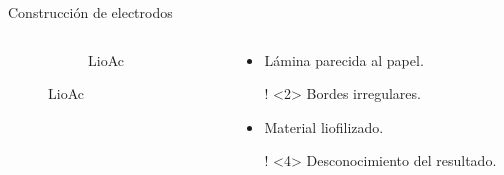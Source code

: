 \documentclass[aspectratio=169]{beamer}
\newcommand{\mLiofilizadoAcero}{LioAc }
\begin{document}
\begin{frame}{Construcción de electrodos}
\begin{columns}
\begin{column}{0.3\textwidth}
\begin{figure}
{\begin{subfigure}[b]{\electrodesWidth}
						\caption{\mLiofilizadoAcero}
					\end{subfigure}}
				\end{figure}
			\end{column}
			\begin{column}{0.6\textwidth}
				\begin{itemize}
					\item<1-2> Lámina parecida al papel.
					\item[!]<2> Bordes irregulares.
					\item<3-4> Material liofilizado.
					\item[!]<4> Desconocimiento del resultado.
				\end{itemize}
			\end{column}
		\end{columns}		
	\end{frame}
\end{document}
